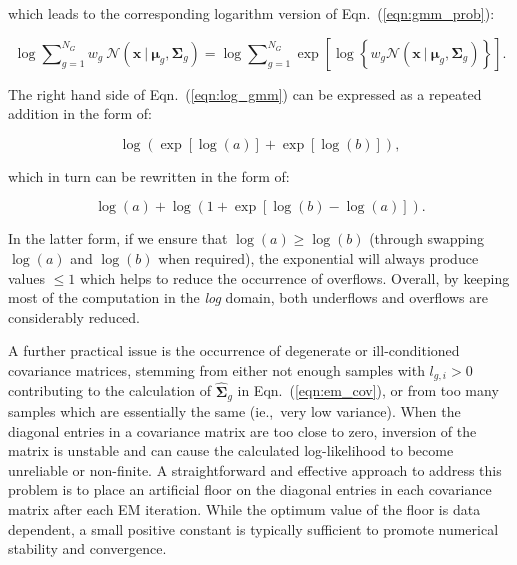 \documentclass[10pt,a4paper]{article}
\def\Vec#1{{\boldsymbol{#1}}}
\def\Mat#1{{\boldsymbol{#1}}}
\begin{document}
\vspace{-1ex}
which leads to the corresponding logarithm version of Eqn.~(\ref{eqn:gmm_prob}):

\vspace{-3ex}
\begin{equation}
\log \sum\nolimits_{g=1}^{N_G} w_g ~ {{\mathcal{N}}}( \Vec{x} ~|~ \Vec{\mu}_g, \Mat{\Sigma}_g )
=
\log \sum\nolimits_{g=1}^{N_G} \exp\left[ \log \left\{ w_g {{\mathcal{N}}}( \Vec{x} ~|~ \Vec{\mu}_g, \Mat{\Sigma}_g ) \right\} \right].
\label{eqn:log_gmm}
\end{equation}

\vspace{-2ex}
The right hand side of Eqn.~(\ref{eqn:log_gmm}) can be expressed as a repeated addition in the form of:

\vspace{-3ex}
\begin{equation}
\log\left( \exp\left[\log(a)\right] + \exp\left[\log(b)\right] \right),
\end{equation}

\vspace{-1ex}
which in turn can be rewritten in the form of:

\vspace{-3ex}
\begin{equation}
\log(a) + \log\left( 1 + \exp\left[ \log(b) - \log(a) \right] \right).
\end{equation}

\vspace{-1ex}
In the latter form, if we ensure that {$\log(a) \geq \log(b)$} (through swapping $\log(a)$ and $\log(b)$ when required),
the exponential will always produce values $\leq 1$ which helps to reduce the occurrence of overflows.
Overall, by keeping most of the computation in the {\it log} domain, 
both underflows and overflows are considerably reduced.

A further practical issue is the occurrence of \mbox{degenerate} or ill-conditioned covariance matrices,
stemming from either not enough samples with $l_{g,i} > 0$ contributing to the calculation of $\widehat{\Mat{\Sigma}}_g$ in Eqn.~(\ref{eqn:em_cov}),
or from too many samples which are essentially the same (ie.,~very low variance).
When the diagonal entries in a covariance matrix are too close to zero,
inversion of the matrix is unstable and can cause the calculated log-likelihood to become unreliable
or non-finite.
A straightforward and effective approach to address this problem is to place an artificial floor
on the diagonal entries in each covariance matrix after each EM iteration.
While the optimum value of the floor is data dependent, a small positive constant is typically sufficient to promote numerical stability
and convergence.
\end{document}
